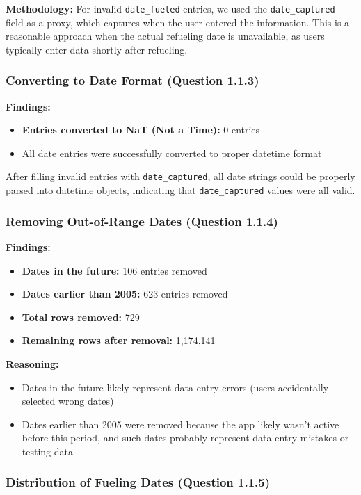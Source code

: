 \documentclass{article}
\begin{document}
\textbf{Methodology:}
For invalid \texttt{date\_fueled} entries, we used the \texttt{date\_captured} field as a proxy, which captures when the user entered the information. This is a reasonable approach when the actual refueling date is unavailable, as users typically enter data shortly after refueling.

\subsubsection{Converting to Date Format (Question 1.1.3)}

\textbf{Findings:}
\begin{itemize}
    \item \textbf{Entries converted to NaT (Not a Time):} 0 entries
    \item All date entries were successfully converted to proper datetime format
\end{itemize}

After filling invalid entries with \texttt{date\_captured}, all date strings could be properly parsed into datetime objects, indicating that \texttt{date\_captured} values were all valid.

\subsubsection{Removing Out-of-Range Dates (Question 1.1.4)}

\textbf{Findings:}
\begin{itemize}
    \item \textbf{Dates in the future:} 106 entries removed
    \item \textbf{Dates earlier than 2005:} 623 entries removed
    \item \textbf{Total rows removed:} 729
    \item \textbf{Remaining rows after removal:} 1,174,141
\end{itemize}

\textbf{Reasoning:}
\begin{itemize}
    \item Dates in the future likely represent data entry errors (users accidentally selected wrong dates)
    \item Dates earlier than 2005 were removed because the app likely wasn't active before this period, and such dates probably represent data entry mistakes or testing data
\end{itemize}

\subsubsection{Distribution of Fueling Dates (Question 1.1.5)}
\end{document}
